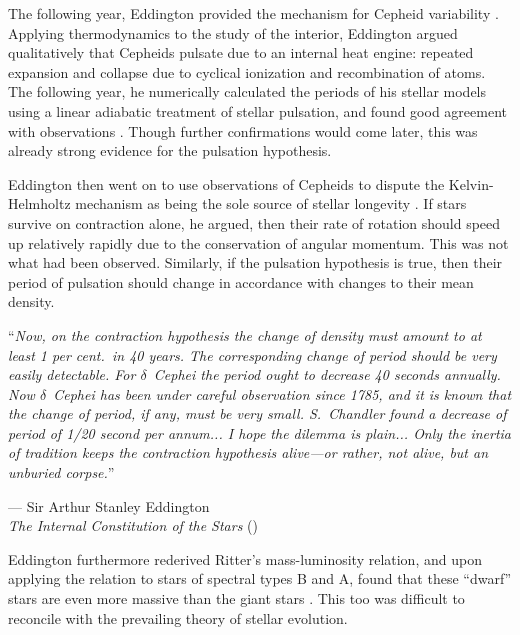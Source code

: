 The following year, Eddington provided the mechanism for Cepheid variability \citep{1917Obs....40..290E}. 
Applying thermodynamics to the study of the interior, Eddington argued qualitatively that Cepheids pulsate due to an internal heat engine: repeated expansion and collapse due to cyclical ionization and recombination of atoms. 
The following year, he numerically calculated the periods of his stellar models using a linear adiabatic treatment of stellar pulsation, and found good agreement with observations \citep{1918MNRAS..79R...2E}. 
Though further confirmations would come later, this was already strong evidence for the pulsation hypothesis.%

Eddington then went on to use observations of Cepheids to dispute the Kelvin-Helmholtz mechanism as being the sole source of stellar longevity \citep{1920SciMo..11..297E}. 
If stars survive on contraction alone, he argued, then their rate of rotation should speed up relatively rapidly due to the conservation of angular momentum. 
This was not what had been observed. 
Similarly, if the pulsation hypothesis is true, then their period of pulsation should change in accordance with changes to their mean density. 
\epigraph{``\emph{Now, on the contraction hypothesis the change of density must amount to at least \hphantom{``}1 per cent.\ in 40 years. The corresponding change of period should be very easily \hphantom{``}detectable. For $\delta$~Cephei the period ought to decrease 40 seconds annually. Now \hphantom{``}$\delta$~Cephei has been under careful observation since 1785, and it is known that \hphantom{``}the change of period, if any, must be very small. S.~Chandler found a decrease of \hphantom{``}period of 1/20 second per annum... I hope the dilemma is plain... Only the inertia \hphantom{``}of tradition keeps the contraction hypothesis alive---or rather, not alive, but an \hphantom{``}unburied corpse.}''}{--- Sir Arthur Stanley Eddington \\\emph{The Internal Constitution of the Stars} (\citeyear{1920SciMo..11..297E})} 

Eddington furthermore rederived Ritter's mass-luminosity relation, and upon applying the relation to stars of spectral types B and A, found that these ``dwarf'' stars are even more massive than the giant stars \citep[e.g.,][]{1924MNRAS..84..308E}. 
This too was difficult to reconcile with the prevailing theory of stellar evolution. 

